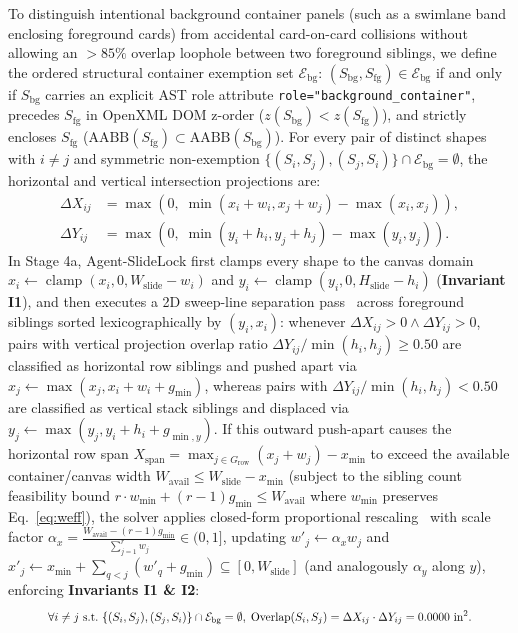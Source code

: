 \documentclass[10pt,journal,compsoc]{IEEEtran}
\begin{document}
To distinguish intentional background container panels (such as a swimlane band enclosing foreground cards) from accidental card-on-card collisions without allowing an $>85\%$ overlap loophole between two foreground siblings, we define the ordered structural container exemption set $\mathcal{E}_{\text{bg}}$: $(S_{\text{bg}}, S_{\text{fg}}) \in \mathcal{E}_{\text{bg}}$ if and only if $S_{\text{bg}}$ carries an explicit AST role attribute \texttt{role="background\_container"}, precedes $S_{\text{fg}}$ in OpenXML DOM z-order ($z(S_{\text{bg}}) < z(S_{\text{fg}})$), and strictly encloses $S_{\text{fg}}$ ($\text{AABB}(S_{\text{fg}}) \subset \text{AABB}(S_{\text{bg}})$). For every pair of distinct shapes with $i \ne j$ and symmetric non-exemption $\{(S_i, S_j), (S_j, S_i)\} \cap \mathcal{E}_{\text{bg}} = \emptyset$, the horizontal and vertical intersection projections are:
\begin{align}
    \Delta X_{ij} &= \max\!\left(0,\; \min(x_i + w_i, x_j + w_j) - \max(x_i, x_j)\right), \\
    \Delta Y_{ij} &= \max\!\left(0,\; \min(y_i + h_i, y_j + h_j) - \max(y_i, y_j)\right).
\end{align}
In Stage 4a, Agent-SlideLock first clamps every shape to the canvas domain $x_i \leftarrow \operatorname{clamp}(x_i, 0, W_{\text{slide}} - w_i)$ and $y_i \leftarrow \operatorname{clamp}(y_i, 0, H_{\text{slide}} - h_i)$ (\textbf{Invariant I1}), and then executes a 2D sweep-line separation pass~\cite{dwyer2005overlap} across foreground siblings sorted lexicographically by $(y_i, x_i)$: whenever $\Delta X_{ij} > 0 \land \Delta Y_{ij} > 0$, pairs with vertical projection overlap ratio $\Delta Y_{ij} / \min(h_i, h_j) \ge 0.50$ are classified as horizontal row siblings and pushed apart via $x_j \leftarrow \max(x_j, x_i + w_i + g_{\min})$, whereas pairs with $\Delta Y_{ij} / \min(h_i, h_j) < 0.50$ are classified as vertical stack siblings and displaced via $y_j \leftarrow \max(y_j, y_i + h_i + g_{\min,y})$. If this outward push-apart causes the horizontal row span $X_{\text{span}} = \max_{j \in G_{\text{row}}}(x_j + w_j) - x_{\min}$ to exceed the available container/canvas width $W_{\text{avail}} \le W_{\text{slide}} - x_{\min}$ (subject to the sibling count feasibility bound $r \cdot w_{\min} + (r - 1) g_{\min} \le W_{\text{avail}}$ where $w_{\min}$ preserves Eq.~\eqref{eq:weff}), the solver applies closed-form proportional rescaling~\cite{badros2001cassowary,dayama2020grids} with scale factor $\alpha_x = \frac{W_{\text{avail}} - (r - 1) g_{\min}}{\sum_{j=1}^r w_j} \in (0, 1]$, updating $w'_j \leftarrow \alpha_x w_j$ and $x'_j \leftarrow x_{\min} + \sum_{q < j} (w'_q + g_{\min}) \subseteq [0, W_{\text{slide}}]$ (and analogously $\alpha_y$ along $y$), enforcing \textbf{Invariants I1 \& I2}:
\begin{equation}
\resizebox{0.88\columnwidth}{!}{$\displaystyle
    \forall i \ne j \text{ s.t.\ } \{(S_i, S_j), (S_j, S_i)\} \cap \mathcal{E}_{\text{bg}} = \emptyset,\; \text{Overlap}(S_i, S_j) = \Delta X_{ij} \cdot \Delta Y_{ij} = 0.0000\text{ in}^2.
$}
\label{eq:aabb}
\end{equation}
\end{document}
